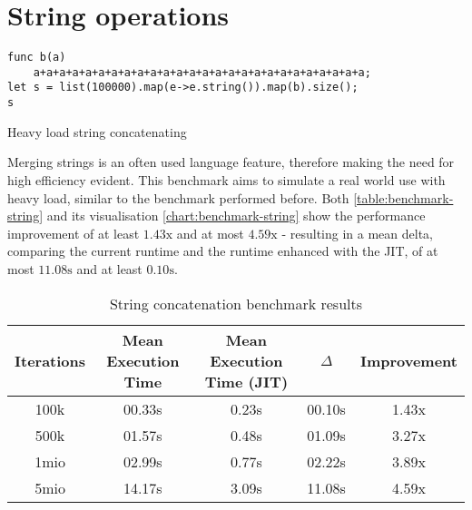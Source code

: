 \section{String operations}

\begin{listing}[H]
    \begin{verbatim}
func b(a)
    a+a+a+a+a+a+a+a+a+a+a+a+a+a+a+a+a+a+a+a+a+a+a+a+a+a;
let s = list(100000).map(e->e.string()).map(b).size();
s
    \end{verbatim}
    \caption{Heavy load string concatenating}
    \label{code:benchmark-string}
\end{listing}

Merging strings is an often used language feature, therefore making the need
for high efficiency evident. This benchmark aims to simulate a real world use
with heavy load, similar to the benchmark performed before. Both
\autoref{table:benchmark-string} and its visualisation
\autoref{chart:benchmark-string} show the performance improvement of at least
$1.43\textrm{x}$ and at most $4.59\textrm{x}$ - resulting in a mean delta,
comparing the current runtime and the runtime enhanced with the JIT, of at most
$11.08\textrm{s}$ and at least $0.10\textrm{s}$.

\begin{table}[H]
    \centering
    \begin{tabular}{c|c|c|c|c}
        Iterations & Mean Execution Time & Mean Execution Time (JIT) & $\Delta$ & Improvement \\ 
        \hline
        100k & 00.33s & 0.23s & 00.10s & 1.43x  \\
        500k & 01.57s & 0.48s & 01.09s & 3.27x  \\ 
        1mio & 02.99s & 0.77s & 02.22s & 3.89x  \\ 
        5mio & 14.17s & 3.09s & 11.08s & 4.59x\\ 
    \end{tabular}
    \caption{String concatenation benchmark results}
    \label{table:benchmark-string}
\end{table}


